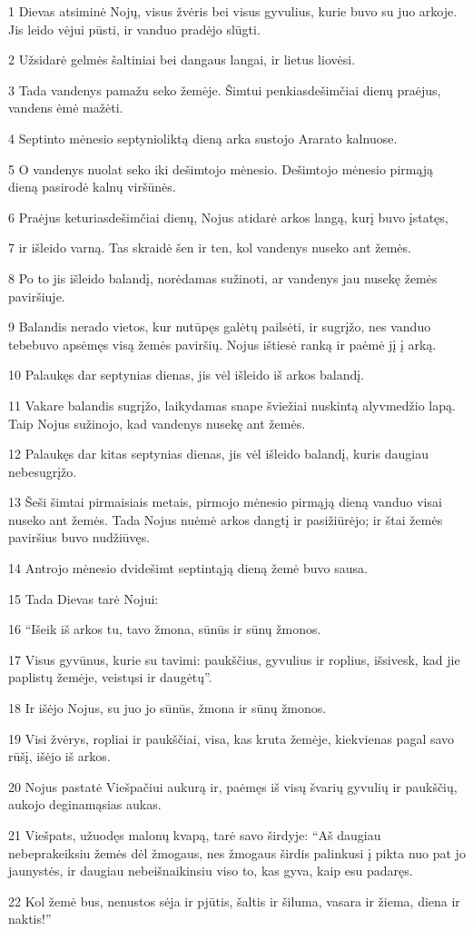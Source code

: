\par 1 Dievas atsiminė Nojų, visus žvėris bei visus gyvulius, kurie buvo su juo arkoje. Jis leido vėjui pūsti, ir vanduo pradėjo slūgti. 
\par 2 Užsidarė gelmės šaltiniai bei dangaus langai, ir lietus liovėsi. 
\par 3 Tada vandenys pamažu seko žemėje. Šimtui penkiasdešimčiai dienų praėjus, vandens ėmė mažėti. 
\par 4 Septinto mėnesio septynioliktą dieną arka sustojo Ararato kalnuose. 
\par 5 O vandenys nuolat seko iki dešimtojo mėnesio. Dešimtojo mėnesio pirmąją dieną pasirodė kalnų viršūnės. 
\par 6 Praėjus keturiasdešimčiai dienų, Nojus atidarė arkos langą, kurį buvo įstatęs, 
\par 7 ir išleido varną. Tas skraidė šen ir ten, kol vandenys nuseko ant žemės. 
\par 8 Po to jis išleido balandį, norėdamas sužinoti, ar vandenys jau nusekę žemės paviršiuje. 
\par 9 Balandis nerado vietos, kur nutūpęs galėtų pailsėti, ir sugrįžo, nes vanduo tebebuvo apsėmęs visą žemės paviršių. Nojus ištiesė ranką ir paėmė jį į arką. 
\par 10 Palaukęs dar septynias dienas, jis vėl išleido iš arkos balandį. 
\par 11 Vakare balandis sugrįžo, laikydamas snape šviežiai nuskintą alyvmedžio lapą. Taip Nojus sužinojo, kad vandenys nusekę ant žemės. 
\par 12 Palaukęs dar kitas septynias dienas, jis vėl išleido balandį, kuris daugiau nebesugrįžo. 
\par 13 Šeši šimtai pirmaisiais metais, pirmojo mėnesio pirmąją dieną vanduo visai nuseko ant žemės. Tada Nojus nuėmė arkos dangtį ir pasižiūrėjo; ir štai žemės paviršius buvo nudžiūvęs. 
\par 14 Antrojo mėnesio dvidešimt septintąją dieną žemė buvo sausa. 
\par 15 Tada Dievas tarė Nojui: 
\par 16 “Išeik iš arkos tu, tavo žmona, sūnūs ir sūnų žmonos. 
\par 17 Visus gyvūnus, kurie su tavimi: paukščius, gyvulius ir roplius, išsivesk, kad jie paplistų žemėje, veistųsi ir daugėtų”. 
\par 18 Ir išėjo Nojus, su juo jo sūnūs, žmona ir sūnų žmonos. 
\par 19 Visi žvėrys, ropliai ir paukščiai, visa, kas kruta žemėje, kiekvienas pagal savo rūšį, išėjo iš arkos. 
\par 20 Nojus pastatė Viešpačiui aukurą ir, paėmęs iš visų švarių gyvulių ir paukščių, aukojo deginamąsias aukas. 
\par 21 Viešpats, užuodęs malonų kvapą, tarė savo širdyje: “Aš daugiau nebeprakeiksiu žemės dėl žmogaus, nes žmogaus širdis palinkusi į pikta nuo pat jo jaunystės, ir daugiau nebeišnaikinsiu viso to, kas gyva, kaip esu padaręs. 
\par 22 Kol žemė bus, nenustos sėja ir pjūtis, šaltis ir šiluma, vasara ir žiema, diena ir naktis!”



